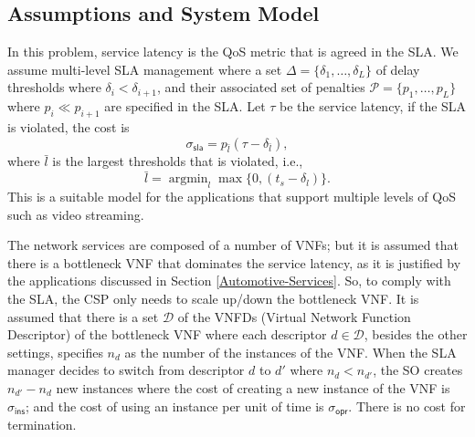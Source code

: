 \documentclass[conference, final]{IEEEtran}
\DeclareMathOperator*{\argmin}{argmin}
\newcommand{\hlb}[2][blue]{{\color{#1} {#2}}\unskip }
\begin{document}
\subsection{Assumptions and System Model}
\label{sec:SLA-Assumption-Model}
\hlb{

In this problem, service latency is the QoS metric that is agreed in the SLA. We assume multi-level SLA management where a set $\Delta=\{\delta_{1},\ldots,\delta_{L}\}$ of delay thresholds where $\delta_{i} < \delta_{i+1}$, and their associated set of penalties $\mathcal{P}=\{p_{1},\ldots,p_{L}\}$ where $p_{i} \ll p_{i+1}$ are specified in the SLA. %
Let $\tau$ be the service latency, if the SLA is violated, the cost is
\begin{equation}
\sigma_{\mathsf{sla}} = p_{\bar{l}}(\tau - \delta_{\bar{l}}),  
\end{equation}
where $\bar{l}$ is the largest thresholds that is violated, i.e., 
\begin{equation*}
\bar{l}=\argmin_{l}\max\{0, (t_{s} - \delta_{l})\}.
\end{equation*}
This is a suitable model for the applications that support multiple levels of QoS such as video streaming.
 
The network services are composed of a number of VNFs; but it is assumed that there is a bottleneck VNF that dominates the service latency, as it is justified by the applications discussed in Section \ref{Automotive-Services}. 
So, to comply with the SLA, the CSP only needs to scale up/down the bottleneck VNF. It is assumed that there is a set $\mathcal{D}$ of the VNFDs (Virtual Network Function Descriptor) of the bottleneck VNF where each descriptor $d \in \mathcal{D}$, besides the other settings, specifies $n_{d}$ as the number of the instances of the VNF. When the SLA manager decides to switch from descriptor $d$ to $d'$ where $n_{d} < n_{d'}$, the SO creates $n_{d'} - n_{d}$ new instances where the cost of creating a new instance of the VNF  is $\sigma_{\textsf{ins}}$; and the cost of using an instance per unit of time is $\sigma_{\textsf{opr}}$. There is no cost for termination.

}
\end{document}

